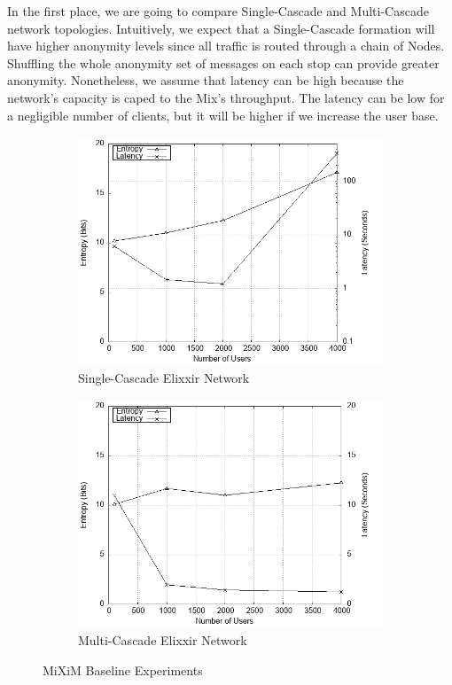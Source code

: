 \documentclass[logo,msc,cyber]{infthesis}   %
\begin{document}
In the first place, we are going to compare Single-Cascade and Multi-Cascade
network topologies. Intuitively, we expect that a Single-Cascade formation will
have higher anonymity levels since all traffic is routed through a chain of
Nodes. Shuffling the whole anonymity set of messages on each stop can provide
greater anonymity. Nonetheless, we assume that latency can be high because the
network's capacity is caped to the Mix's throughput. The latency can be low for
a negligible number of clients, but it will be higher if we increase the user
base.

\begin{figure}[h!]
    \centering
    \begin{subfigure}[b]{0.45\textwidth}
        \centering
        \includegraphics[width=\textwidth]{figures/simulator/1_a.png}
        \caption{Single-Cascade Elixxir Network}
        \label{fig:elixxir-cascade}
    \end{subfigure}
    \hfill
    \begin{subfigure}[b]{0.45\textwidth}
        \centering
        \includegraphics[width=\textwidth]{figures/simulator/1_b.png}
        \caption{Multi-Cascade Elixxir Network}
        \label{fig:elixxir-multi-cascade}
    \end{subfigure}
       \caption{MiXiM Baseline Experiments}
       \label{fig:elixxir}
 \end{figure}
\end{document}
